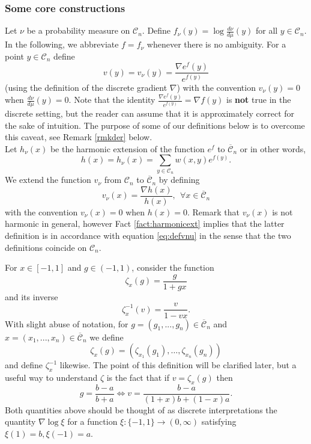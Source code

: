 \documentclass[12pt]{article}
\def \CC {\mathbb C}
\def \DC {\mathcal{C}_n}
\def \CC {\overline{\mathcal{C}}_n}
\theoremstyle{definition}
\theoremstyle{remark}
\begin{document}
\subsubsection{Some core constructions}
Let $\nu$ be a probability measure on $\DC$. Define $f_{\nu}(y) = \log \frac{d \nu}{d \mu}(y)$ for all $y \in \DC$. In the following, we abbreviate $f=f_\nu$ whenever there is no ambiguity. For a point $y \in \DC$ define 
\begin{equation}\label{eq:defvnu}
v(y) = v_\nu(y) = \frac{\nabla e^{f}(y)}{e^{f(y)}}
\end{equation}
(using the definition of the discrete gradient $\nabla$) with the convention $v_\nu(y)=0$ when $\frac{d \nu}{d \mu}(y)=0$. Note that the identity $\frac{\nabla e^{f}(y)}{e^{f(y)}} = \nabla f(y)$ is \textbf{not} true in the discrete setting, but the reader can assume that it is approximately correct for the sake of intuition. The purpose of some of our definitions below is to overcome this caveat, see Remark \ref{rmkder} below. \\

Let $h_\nu(x)$ be the harmonic extension of the function $e^f$ to $\CC$ or in other words,
$$
h(x) = h_\nu(x) = \sum_{y \in \DC} w(x,y) e^{f(y)}.
$$
We extend the function $v_\nu$ from $\DC$ to $\CC$ by defining
\begin{equation}\label{eq:defvx2}
v_\nu(x) = \frac{\nabla h(x)}{h(x)}, ~~ \forall x \in \CC
\end{equation}
with the convention $v_\nu(x) = 0$ when $h(x)=0$. Remark that $v_\nu(x)$ is not harmonic in general, however Fact \ref{fact:harmonicext} implies that the latter definition is in accordance with equation \eqref{eq:defvnu} in the sense that the two definitions coincide on $\DC$.

For $x \in [-1,1]$ and $g \in (-1,1)$, consider the function
$$
\zeta_x(g) = \frac{ g }{ 1 + g x }
$$
and its inverse
$$
\zeta_x^{-1} (v) = \frac{v}{1 - v x}. 
$$
With slight abuse of notation, for $g=(g_1,...,g_n) \in \CC$ and $x=(x_1,...,x_n) \in \CC$  we define
$$
\zeta_x (g) = (\zeta_{x_1}(g_1), \dots , \zeta_{x_n} (g_n) )
$$
and define $\zeta^{-1}_x$ likewise. The point of this definition will be clarified later, but a useful way to understand $\zeta$ is the fact that if $v=\zeta_x(g)$ then
\begin{equation}\label{eq:gv}
g = \frac{b-a}{b+a} \Leftrightarrow v = \frac{b-a}{(1+x)b+(1-x)a}. 
\end{equation}
Both quantities above should be thought of as discrete interpretations the quantity $\nabla \log \xi$ for a function $\xi:\{-1,1\} \to (0,\infty)$ satisfying $\xi(1) = b, \xi(-1) = a$. 
\end{document}
